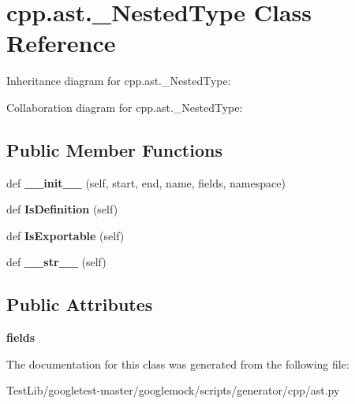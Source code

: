 \hypertarget{classcpp_1_1ast_1_1__NestedType}{}\section{cpp.\+ast.\+\_\+\+Nested\+Type Class Reference}
\label{classcpp_1_1ast_1_1__NestedType}


Inheritance diagram for cpp.\+ast.\+\_\+\+Nested\+Type\+:


Collaboration diagram for cpp.\+ast.\+\_\+\+Nested\+Type\+:
\subsection*{Public Member Functions}
\begin{DoxyCompactItemize}
\item 
\mbox{\label{classcpp_1_1ast_1_1__NestedType_a63acff60f38885be6cc11231fffc3f4e}} 
def {\bfseries \+\_\+\+\_\+init\+\_\+\+\_\+} (self, start, end, name, fields, namespace)
\item 
\mbox{\label{classcpp_1_1ast_1_1__NestedType_a9f160999863f39c9032f60b014e213d5}} 
def {\bfseries Is\+Definition} (self)
\item 
\mbox{\label{classcpp_1_1ast_1_1__NestedType_a689f8b0dc20e6070938825eee483dd2f}} 
def {\bfseries Is\+Exportable} (self)
\item 
\mbox{\label{classcpp_1_1ast_1_1__NestedType_a18901ec6acba88c526d703444bf4d52c}} 
def {\bfseries \+\_\+\+\_\+str\+\_\+\+\_\+} (self)
\end{DoxyCompactItemize}
\subsection*{Public Attributes}
\begin{DoxyCompactItemize}
\item 
\mbox{\label{classcpp_1_1ast_1_1__NestedType_aed69c37a409b4d26e6cfde2de3185d86}} 
{\bfseries fields}
\end{DoxyCompactItemize}


The documentation for this class was generated from the following file\+:\begin{DoxyCompactItemize}
\item 
Test\+Lib/googletest-\/master/googlemock/scripts/generator/cpp/ast.\+py\end{DoxyCompactItemize}
